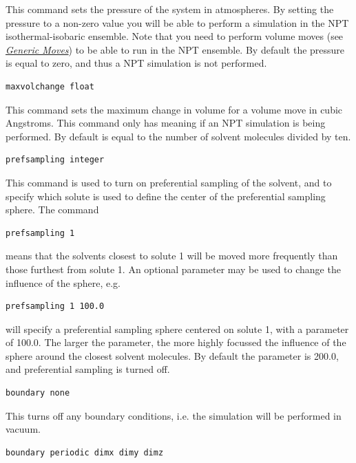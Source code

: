 \documentclass[letterpaper,10pt,english]{manual}
\begin{document}
This command sets the pressure of the system in atmospheres. By setting the pressure to a non-zero value you will be able to perform a simulation in the NPT isothermal-isobaric ensemble. Note that you need to perform volume moves (see \hyperlink{moves}{\emph{Generic Moves}}) to be able to run in the NPT ensemble. By default the pressure is equal to zero, and thus a NPT simulation is not performed.
\begin{Verbatim}[commandchars=@\[\]]
maxvolchange float
\end{Verbatim}

This command sets the maximum change in volume for a volume move in cubic Angstroms. This command only has meaning if an NPT simulation is being performed. By default  is equal to the number of solvent molecules divided by ten.

\begin{Verbatim}[commandchars=@\[\]]
prefsampling integer
\end{Verbatim}

This command is used to turn on preferential sampling of the solvent, and to specify which solute is used to define the center of the preferential sampling sphere. The command
\begin{Verbatim}[commandchars=@\[\]]
prefsampling 1
\end{Verbatim}

means that the solvents closest to solute 1 will be moved more frequently than those furthest from solute 1. An optional parameter may be used to change the influence of the sphere, e.g.

\begin{Verbatim}[commandchars=@\[\]]
prefsampling 1 100.0
\end{Verbatim}

will specify a preferential sampling sphere centered on solute 1, with a parameter of 100.0. The larger the parameter, the more highly focussed the influence of the sphere around the closest solvent molecules. By default the parameter is 200.0, and preferential sampling is turned off.
\begin{Verbatim}[commandchars=@\[\]]
boundary none
\end{Verbatim}

This turns off any boundary conditions, i.e. the simulation will be performed in vacuum.

\begin{Verbatim}[commandchars=@\[\]]
boundary periodic dimx dimy dimz
\end{Verbatim}
\end{document}
